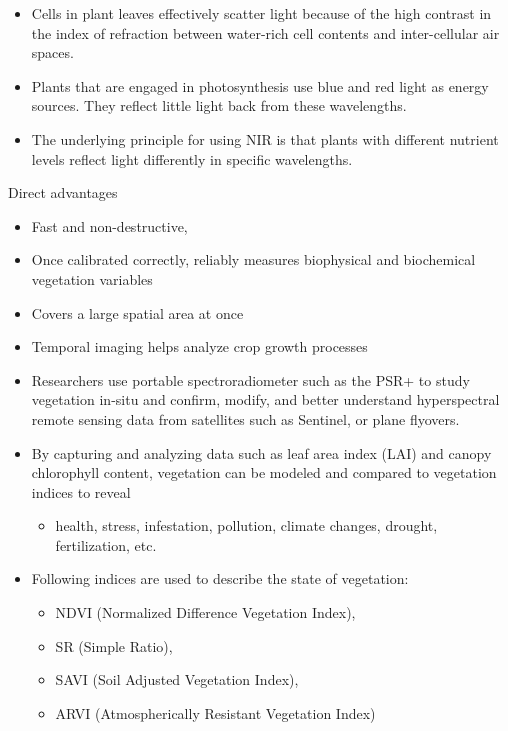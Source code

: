 \documentclass[11pt,dvipsnames,ignorenonframetext,aspectratio=169]{beamer}
\providecommand{\tightlist}{%
  \setlength{\itemsep}{0pt}\setlength{\parskip}{0pt}}
\begin{document}
\begin{frame}{}
\protect\hypertarget{section-3}{}
\begin{itemize}
\tightlist
\item
  Cells in plant leaves effectively scatter light because of the high
  contrast in the index of refraction between water-rich cell contents
  and inter-cellular air spaces.
\item
  Plants that are engaged in photosynthesis use blue and red light as
  energy sources. They reflect little light back from these wavelengths.
\item
  The underlying principle for using NIR is that plants with different
  nutrient levels reflect light differently in specific wavelengths.
\end{itemize}
\end{frame}

\begin{frame}{Direct advantages}
\protect\hypertarget{direct-advantages}{}
\begin{itemize}
\tightlist
\item
  Fast and non-destructive,
\item
  Once calibrated correctly, reliably measures biophysical and
  biochemical vegetation variables
\item
  Covers a large spatial area at once
\item
  Temporal imaging helps analyze crop growth processes
\end{itemize}
\end{frame}

\begin{frame}{}
\protect\hypertarget{section-4}{}
\begin{itemize}
\tightlist
\item
  Researchers use portable spectroradiometer such as the PSR+ to study
  vegetation in-situ and confirm, modify, and better understand
  hyperspectral remote sensing data from satellites such as Sentinel, or
  plane flyovers.
\item
  By capturing and analyzing data such as leaf area index (LAI) and
  canopy chlorophyll content, vegetation can be modeled and compared to
  vegetation indices to reveal

  \begin{itemize}
  \tightlist
  \item
    health, stress, infestation, pollution, climate changes, drought,
    fertilization, etc.
  \end{itemize}
\item
  Following indices are used to describe the state of vegetation:

  \begin{itemize}
  \tightlist
  \item
    NDVI (Normalized Difference Vegetation Index),
  \item
    SR (Simple Ratio),
  \item
    SAVI (Soil Adjusted Vegetation Index),
  \item
    ARVI (Atmospherically Resistant Vegetation Index)
  \end{itemize}
\end{itemize}
\end{frame}
\end{document}
